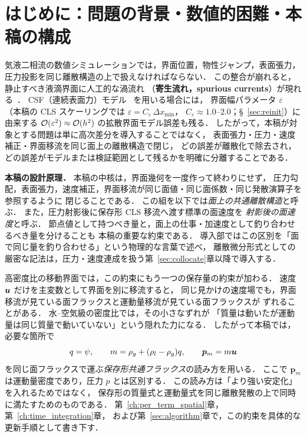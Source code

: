 
\section{はじめに：問題の背景・数値的困難・本稿の構成}
\label{sec:intro}


気液二相流の数値シミュレーションでは，界面位置，物性ジャンプ，表面張力，
圧力投影を同じ離散構造の上で扱えなければならない．
この整合が崩れると，静止すべき液滴界面に人工的な渦流れ
（\textbf{寄生流れ，spurious currents}）が現れる~\cite{Popinet2009, Francois2006}．
CSF（連続表面力）モデル~\cite{Brackbill1992} を用いる場合には，
界面幅パラメータ $\varepsilon$
（本稿の CLS スケーリングでは $\varepsilon = C_\varepsilon\,\Delta x_{\min}$，
$C_\varepsilon \approx 1.0$--$2.0$；§~\ref{sec:reinit}）に由来する
$\mathcal{O}(\varepsilon^2) \approx \mathcal{O}(h^2)$ の拡散界面モデル誤差も残る．
したがって，本稿が対象とする問題は単に高次差分を導入することではなく，
表面張力・圧力・速度補正・界面移流を同じ面上の離散構造で閉じ，
どの誤差が離散化で除去され，どの誤差がモデルまたは検証範囲として残るかを明確に分離することである．

\noindent\textbf{本稿の設計原理．}
本稿の中核は，界面幾何を一度作って終わりにせず，
圧力勾配，表面張力，速度補正，界面移流が同じ面値・同じ面係数・同じ発散演算子を参照するように
閉じることである．
この組を以下では\emph{面上の共通離散構造}と呼ぶ．
また，圧力射影後に保存形 CLS 移流へ渡す標準の面速度を
\emph{射影後の面速度}と呼ぶ．
節点値として持つべき量と，面上の仕事・加速度として釣り合わせるべき量を分けることも
本稿の重要な約束である．
導入部ではこの区別を「面で同じ量を釣り合わせる」という物理的な言葉で述べ，
離散微分形式としての厳密な記法は，圧力・速度連成を扱う第~\ref{sec:collocate}章以降で導入する．

高密度比の移動界面では，この約束にもう一つの保存量の約束が加わる．
速度 $\bm{u}$ だけを主変数として界面を別に移流すると，
同じ見かけの速度場でも，界面移流が見ている面フラックスと運動量移流が見ている面フラックスが
ずれることがある．
水--空気級の密度比では，その小さなずれが
「質量は動いたが運動量は同じ質量で動いていない」という隠れた力になる．
したがって本稿では，必要な箇所で
\[
  q=\psi,\qquad
  m=\rho_g+(\rho_l-\rho_g)q,\qquad
  \bm{p}_m=m\bm{u}
\]
を同じ面フラックスで運ぶ\emph{保存形共通フラックス}の読み方を用いる．
ここで $\bm{p}_m$ は運動量密度であり，圧力 $p$ とは区別する．
この読み方は「より強い安定化」を入れるためではなく，
保存形の質量式と運動量式を同じ離散発散の上で同時に満たすためのものである．
第~\ref{ch:per_term_spatial}章，第~\ref{ch:time_integration}章，
および第~\ref{sec:algorithm}章で，この約束を具体的な更新手順として書き下す．

